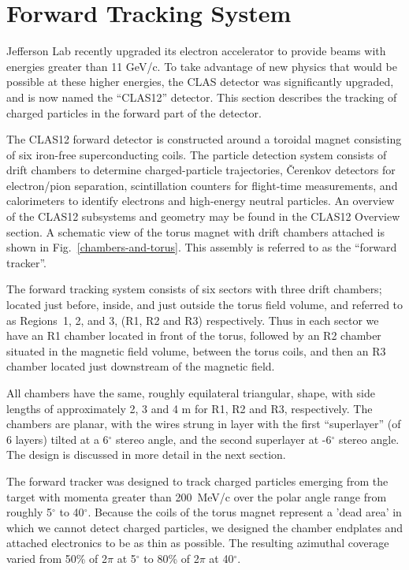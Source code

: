 \section{Forward Tracking System}
\label{overview}

Jefferson Lab recently upgraded its electron accelerator to provide beams with 
energies greater than 11 GeV/c.  To take advantage of new physics that would 
be possible at these higher energies, the CLAS detector was significantly
upgraded, and is now named the ``CLAS12'' detector.  This section describes
the tracking of charged particles in the forward part of the detector.


The CLAS12 forward detector is constructed around a toroidal magnet consisting of six 
iron-free superconducting coils.  The particle detection system consists of drift 
chambers to determine charged-particle trajectories, {\v C}erenkov detectors 
for electron/pion separation, scintillation counters for flight-time 
measurements, and calorimeters to identify electrons and high-energy neutral 
particles.  An overview of the CLAS12 subsystems and geometry may be found in the 
CLAS12 Overview section.  A schematic view of the torus magnet with drift chambers
attached is shown in Fig.~\ref{chambers-and-torus}.   This assembly is referred to
as the ``forward tracker''. 

The forward tracking system consists of six sectors with three drift
chambers; located just before, inside, 
and just outside the torus field volume, and referred to as Regions~1, 2, 
and 3, (R1, R2 and R3) respectively.  Thus in each sector we have an R1 chamber located
in front of the torus, followed by an R2 chamber situated in the magnetic
field volume, between the torus coils, and then an R3 chamber located just
downstream of the magnetic field.

All chambers have the same, roughly equilateral triangular, shape, with
side lengths of approximately 2, 3 and 4 m for R1, R2 and R3, respectively.
The chambers are planar, with the wires strung in layer with the first ``superlayer'' (of 6 layers)
tilted at a 6$^\circ$ stereo angle, and the second superlayer at -6$^\circ$ stereo
angle.  The design is discussed in more detail in the next section.

The forward tracker was designed to track charged particles emerging from the target with
momenta greater than 200~MeV/c over the polar angle range from roughly 5$^{\circ}$ to 
40$^{\circ}$.  Because the coils of the torus magnet represent a 'dead area'
in which we cannot detect charged particles, we designed the chamber endplates
and attached electronics to be as thin as possible.  The resulting azimuthal
coverage varied from 50\% of 2$\pi$ at 5$^{\circ}$ to 80\% of 2$\pi$ at 40$^{\circ}$.


